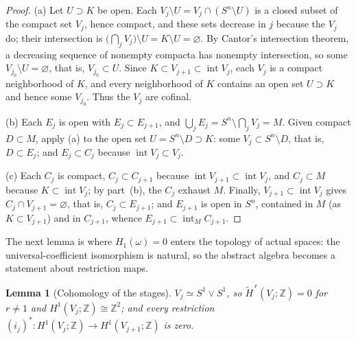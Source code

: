 \documentclass[12pt,oneside,a4paper]{article}
\theoremstyle{mytheorem}
\newtheorem{lemma}[definition]{Lemma}
\theoremstyle{remark}
\theoremstyle{definition}
\begin{document}
\begin{proof}
(a) Let $U\supset K$ be open.  Each $V_j\setminus U=V_j\cap(S^n
\setminus U)$ is a closed subset of the compact set $V_j$, hence compact,
and these sets decrease in $j$ because the $V_j$ do; their intersection is
$\bigl(\bigcap_jV_j\bigr)\setminus U=K\setminus U=\varnothing$.  By Cantor's
intersection theorem, a decreasing sequence of nonempty compacta has
nonempty intersection, so some $V_{j_0}\setminus U=\varnothing$, that is,
$V_{j_0}\subset U$.  Since $K\subset V_{j+1}\subset\operatorname{int}V_j$, each
$V_j$ is a compact neighborhood of $K$, and every neighborhood of $K$
contains an open set $U\supset K$ and hence some $V_{j_0}$.  Thus the
$V_j$ are cofinal.



(b) Each $E_j$ is open with $E_j\subset E_{j+1}$, and
$\bigcup_jE_j=S^n\setminus\bigcap_jV_j=M$.  Given compact
$D\subset M$, apply (a) to the open set
$U=S^n\setminus D\supset K$: some $V_j\subset S^n\setminus
D$, that is, $D\subset E_j$; and $E_j\subset C_j$ because
$\operatorname{int}V_j\subset V_j$.

(c) Each $C_j$ is compact, $C_j\subset C_{j+1}$ because
$\operatorname{int}V_{j+1}\subset\operatorname{int}V_j$, and $C_j\subset M$ because
$K\subset\operatorname{int}V_j$; by part~(b), the $C_j$ exhaust $M$.  Finally,
$V_{j+1}\subset\operatorname{int}V_j$ gives $C_j\cap V_{j+1}=\varnothing$, that
is, $C_j\subset E_{j+1}$; and $E_{j+1}$ is open in $S^n$, contained
in $M$ (as $K\subset V_{j+1}$) and in $C_{j+1}$, whence
$E_{j+1}\subset\operatorname{int}_M C_{j+1}$.
\end{proof}


The next lemma is where $H_1(\omega)=0$ enters the topology of
actual spaces: the universal-coefficient isomorphism is natural, so
the abstract algebra becomes a statement about restriction maps.

\begin{lemma}[Cohomology of the stages]\label{transfer}
$V_j\simeq S^1\vee S^1$, so
$\widetilde H^{\,r}(V_j;\mathbb{Z})=0$ for $r\ne1$ and
$H^1(V_j;\mathbb{Z})\cong\mathbb{Z}^2$; and every restriction
$(i_j)^*:H^1(V_j;\mathbb{Z})\to H^1(V_{j+1};\mathbb{Z})$ is zero.
\end{lemma}
\end{document}
